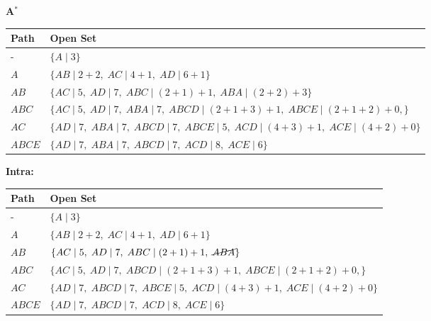 \begin{example} \textbf{A$^*$}
    \begin{center}
        \begin{tabular}{ll}
        \toprule
        \textbf{Path} & \textbf{Open Set} \\
        \midrule
        - & $\{A \mid 3 \}$ \\
        $A$ & $\{AB \mid 2 + 2, \; AC \mid 4 + 1, \; AD \mid 6 + 1\}$ \\
        $AB$ & $\{AC \mid 5, \; AD \mid 7, \; ABC \mid (2 + 1) + 1, \; ABA \mid (2 + 2) + 3 \}$ \\
        $ABC$ & $\{AC \mid 5, \; AD \mid 7, \; ABA \mid 7, \; ABCD \mid (2 + 1 + 3) + 1, \; ABCE \mid (2 + 1 + 2) + 0, \}$ \\
        $AC$ & $\{AD \mid 7, \; ABA \mid 7, \; ABCD \mid 7, \; ABCE \mid 5, \; ACD \mid (4 + 3) + 1, \; ACE \mid (4 + 2) + 0\}$ \\
        $ABCE$ & $\{AD \mid 7, \; ABA \mid 7, \; ABCD \mid 7, \; ACD \mid 8, \; ACE \mid 6 \}$ \\
        \bottomrule
        \end{tabular}
    \end{center}
    \vspace{1em}

    \textbf{Intra:}
    \begin{center}
        \begin{tabular}{ll}
        \toprule
        \textbf{Path} & \textbf{Open Set} \\
        \midrule
        - & $\{A \mid 3 \}$ \\
        $A$ & $\{AB \mid 2 + 2, \; AC \mid 4 + 1, \; AD \mid 6 + 1\}$ \\
        $AB$ & $\{AC \mid 5, \; AD \mid 7, \; ABC \mid (2 + 1) + 1, \; \cancel{ABA} \}$ \\
        $ABC$ & $\{AC \mid 5, \; AD \mid 7, \; ABCD \mid (2 + 1 + 3) + 1, \; ABCE \mid (2 + 1 + 2) + 0, \}$ \\
        $AC$ & $\{AD \mid 7, \; ABCD \mid 7, \; ABCE \mid 5, \; ACD \mid (4 + 3) + 1, \; ACE \mid (4 + 2) + 0\}$ \\
        $ABCE$ & $\{AD \mid 7, \; ABCD \mid 7, \; ACD \mid 8, \; ACE \mid 6 \}$ \\
        \bottomrule
        \end{tabular}
    \end{center}
    \vspace{1em}


\end{example}
